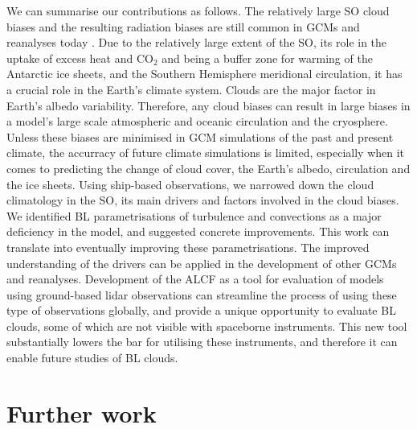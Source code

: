 We can summarise our contributions as follows. The relatively large SO
cloud biases and the resulting radiation biases are still common in GCMs
and reanalyses today \citep{gettelman2020}. Due to the relatively large
extent of the SO, its role in the uptake of excess heat and CO$_2$
and being a buffer zone for warming of the Antarctic ice sheets, and the Southern Hemisphere
meridional circulation, it has a crucial role in the Earth's climate system.
Clouds are the major factor in Earth's albedo variability. Therefore, any cloud
biases can result in large biases in a model's large scale atmospheric
and oceanic circulation and the cryosphere. Unless these biases are minimised
in GCM simulations of the past and present climate, the accurracy of future climate
simulations is limited, especially when it comes to predicting the change
of cloud cover, the Earth's albedo, circulation and the ice sheets.
Using ship-based observations, we narrowed down the cloud climatology
in the SO, its main drivers and factors involved in the cloud biases. We
identified BL parametrisations of turbulence and convections as a major deficiency
in the model, and suggested concrete improvements. This work can translate into
eventually improving these parametrisations. The improved understanding of the
drivers can be applied in the development of other GCMs and reanalyses.
Development of the ALCF as a tool for evaluation of models using ground-based
lidar observations can streamline the process of using these type of observations
globally, and provide a unique opportunity to evaluate BL clouds, some of
which are not visible with spaceborne instruments. This new tool substantially
lowers the bar for utilising these instruments, and therefore it can enable
future studies of BL clouds.

\section{Further work}

